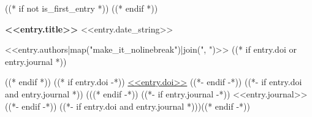 ((* if not is_first_entry *))
\vspace{<<design.margins.entry_area.vertical_between>>}
((* endif *))

\begin{onecolentry}
    \textbf{<<entry.title>>} \hfill <<entry.date_string>>

    \vspace{<<design.margins.highlights_area.vertical_between_bullet_points>>}

    <<entry.authors|map("make_it_nolinebreak")|join(", ")>>
    ((* if entry.doi or entry.journal *))
    \vspace{<<design.margins.highlights_area.vertical_between_bullet_points>>}

    ((* endif *))
    ((* if entry.doi -*))
    \href{<<entry.doi_url>>}{<<entry.doi>>}
    ((*- endif -*))
    ((*- if entry.doi and entry.journal *)) (((* endif -*))
    ((*- if entry.journal -*))
    <<entry.journal>>
    ((*- endif -*))
    ((*- if entry.doi and entry.journal *)))((* endif -*))

\end{onecolentry}
